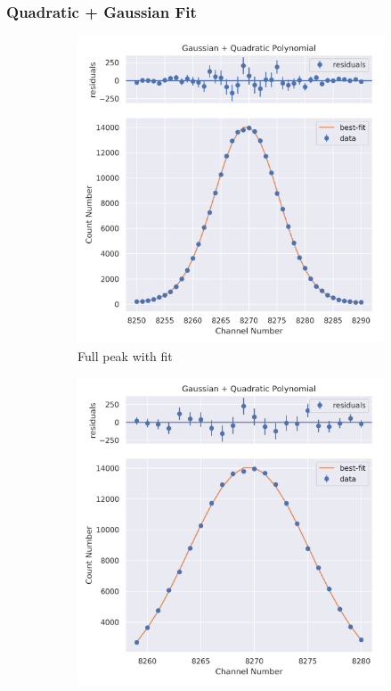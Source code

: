 \documentclass[11pt,a4paper]{article}
\begin{document}
\subsubsection{Quadratic + Gaussian Fit}
\begin{figure}[H]
  \centering
  \begin{subfigure}{.5\linewidth}
    \centering
    \includegraphics[width=\linewidth]{./Images/Cobalt60/Quad/Quad_1_Full.png}
    \caption{Full peak with fit}
  \end{subfigure}%
  \begin{subfigure}{.5\linewidth}
    \centering
    \includegraphics[width=\linewidth]{./Images/Cobalt60/Quad/Quad_1_Zoom.png}

\end{subfigure}
\end{figure}
\end{document}
